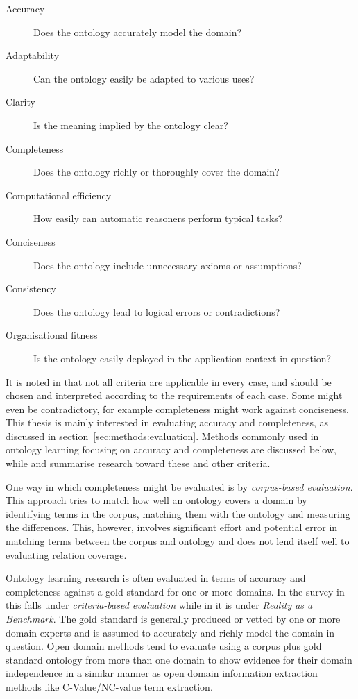 \documentclass[a4paper]{report}
\begin{document}
\begin{description}
\item [Accuracy] Does the ontology accurately model the domain?
\item [Adaptability] Can the ontology easily be adapted to various uses?
\item [Clarity] Is the meaning implied by the ontology clear?
\item [Completeness] Does the ontology richly or thoroughly cover the domain?
\item [Computational efficiency] How easily can automatic reasoners perform typical tasks?
\item [Conciseness] Does the ontology include unnecessary axioms or assumptions?
\item [Consistency] Does the ontology lead to logical errors or contradictions?
\item [Organisational fitness] Is the ontology easily deployed in the application context in question?
\end{description}

It is noted in \cite{HOO2009OntEval} that not all criteria are applicable in every case, and should be chosen and interpreted according to the requirements of each case.
Some might even be contradictory, for example completeness might work against conciseness\cite{HOO2009OntEval}.
This thesis is mainly interested in evaluating accuracy and completeness, as discussed in section~\ref{sec:methods:evaluation}.
Methods commonly used in ontology learning focusing on accuracy and completeness are discussed below, while \cite{HOO2009OntEval} and \cite{ObrstEtAl07EvalOfOnt} summarise research toward these and other criteria.

One way in which completeness might be evaluated is by \emph{corpus-based evaluation}\cite{Wong11Survey}.
This approach tries to match how well an ontology covers a domain by identifying terms in the corpus, matching them with the ontology and measuring the differences.
This, however, involves significant effort and potential error in matching terms between the corpus and ontology and does not lend itself well to evaluating relation coverage\cite{ObrstEtAl07EvalOfOnt}.

Ontology learning research is often evaluated in terms of accuracy and completeness against a gold standard for one or more domains\cite{Hjelm09Thesis, Zouaq11OntoCmaps, Drymonas10OntoGain, Drumond10PREHE}.
In the survey in \cite{Wong11Survey} this falls under \emph{criteria-based evaluation} while in \cite{ObrstEtAl07EvalOfOnt} it is under \emph{Reality as a Benchmark}.
The gold standard is generally produced or vetted by one or more domain experts and is assumed to accurately and richly model the domain in question.
Open domain methods tend to evaluate using a corpus plus gold standard ontology from more than one domain to show evidence for their domain independence in a similar manner as open domain information extraction methods like C-Value/NC-value term extraction\cite{Frantzi98CNCValue}.
\end{document}
